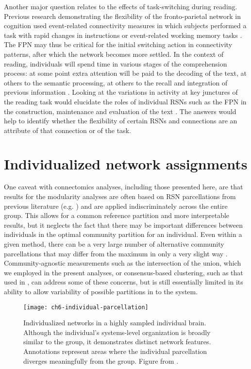 Another major question relates to the effects of task-switching during reading. Previous research demonstrating the flexibility of the fronto-parietal network in cognition used event-related connectivity measures in which subjects performed a task with rapid changes in instructions or event-related working memory tasks \citep{Cole2013, Braun2015}. The FPN may thus be critical for the initial switching action in connectivity patterns, after which the network becomes more settled. In the context of reading, individuals will spend time in various stages of the comprehension process: at some point extra attention will be paid to the decoding of the text, at others to the semantic processing, at others to the recall and integration of previous information \citep{Spreng2013}. Looking at the variations in activity at key junctures of the reading task would elucidate the roles of individual RSNs such as the FPN in the construction, maintenance and evaluation of the text \citep{Sakai2008}. The answers would help to identify whether the flexibility of certain RSNs and connections are an attribute of that connection or of the task.

\section{Individualized network assignments}

One caveat with connectomics analyses, including those presented here, are that results for the modularity analyses are often based on RSN parcellations from previous literature (e.g. \citep{Power2011}) and are applied indiscriminately across the entire group. This allows for a common reference partition and more interpretable results, but it neglects the fact that there may be important differences between individuals in the optimal community partition for an individual. Even within a given method, there can be a very large number of alternative community parcellations that may differ from the maximum in only a very slight way \citep{Good2010}. Community-agnostic measurements such as the intersection of the union, which we employed in the present analyses, or consensus-based clustering, such as that used in \citep{Power2011}, can address some of these concerns, but is still essentially limited in its ability to allow variability of possible partitions in to the system. 

\begin{figure}[t]
	\centering
	\texttt{[image: ch6-individual-parcellation]}
	\caption[Individualized networks in a highly sampled individual brain]{Individualized networks in a highly sampled individual brain. Although the individual's systems-level organization is broadly similar to the group, it demonstrates distinct network features. Annotations represent areas where the individual parcellation diverges meaningfully from the group. Figure from \citep{Laumann2015}.}
	\label{fig:ch6-individual-parcellation}
\end{figure}

